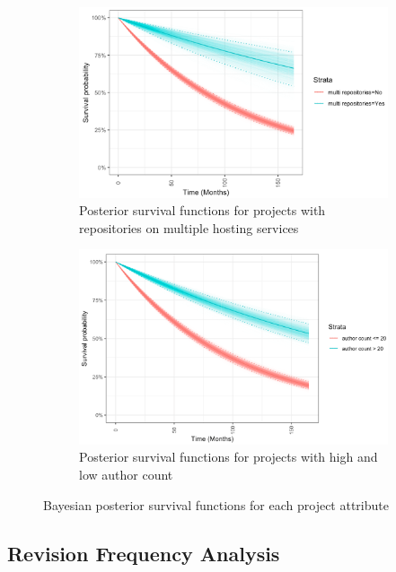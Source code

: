 \documentclass[acmconf]{acmart}
\begin{document}
\begin{figure}[!ht]
\begin{subfigure}[b]{0.45\columnwidth}
        \includegraphics[width=\textwidth]{multi_repo_bayes.png}
        \caption{\small Posterior survival functions for projects with repositories on multiple hosting services}
        \label{fig:bayes_multi_repo}
    \end{subfigure}
    \hfill
    \begin{subfigure}[b]{0.45\columnwidth}
        \centering 
        \includegraphics[width=\textwidth]{author_count_bayes.png} 
        \caption{\small Posterior survival functions for projects with high and low author count}
        \label{fig:bayes_author_count}
    \end{subfigure}
    \caption{\small Bayesian posterior survival functions for each project attribute} 
    \label{fig:Bayesian posterior survival functions}
\end{figure}

\subsection{Revision Frequency Analysis} \label{rev-freq-results}
\end{document}
